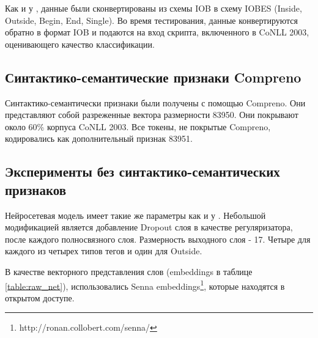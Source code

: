 \documentclass[a4paper,12pt]{article}
\begin{document}
Как и у \citep{collobert2011natural}, данные были сконвертированы из схемы IOB
в схему IOBES (Inside, Outside, Begin, End, Single).
Во время тестирования, данные конвертируются обратно в формат IOB и подаются на вход скрипта,
включенного в CoNLL 2003, оценивающего качество классификации.

\subsection{Синтактико-семантические признаки Compreno}
Синтактико-семантически признаки были получены с помощью Compreno.
Они представляют собой разреженные вектора размерности 83950.
Они покрывают около 60\% корпуса CoNLL 2003.
Все токены, не покрытые Compreno, кодировались как дополнительный признак 83951.

\subsection{Эксперименты без синтактико-семантических признаков}

Нейросетевая модель имеет такие же параметры как и у \citep{collobert2011natural}.
Небольшой модификацией является добавление Dropout слоя в качестве регуляризатора,
после каждого полносвязного слоя.
Размерность выходного слоя - 17. Четыре для каждого из четырех типов тегов и один для Outside.

В качестве векторного представления слов (embeddings в таблице \ref{table:raw_net}),
использовались Senna embeddings\footnote{http://ronan.collobert.com/senna/},
которые находятся в открытом доступе.
\end{document}
